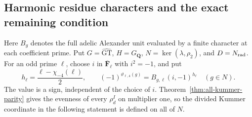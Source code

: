 \subsection{Harmonic residue characters and the exact remaining condition}

Here \(B_g\) denotes the full adelic Alexander unit evaluated by a
finite character at each coefficient prime. Put \(G=\widehat{\mathrm{GT}}\),
\(H=G_{\mathbf Q}\), \(N=\ker(\lambda,\rho_2)\), and
\(D=N_{\rm rad}\). For an odd prime \(\ell\), choose \(i\) in
\(\overline{\mathbf F}_\ell\) with \(i^2=-1\), and put
\[
 h_\ell=\frac{\ell-\chi_{-4}(\ell)}2,\qquad
 (-1)^{\vartheta_{\ell,4}(g)}
       =B_{g,\ell}(i,-1)^{h_\ell}\quad(g\in N).
\]
The value is a sign, independent of the choice of \(i\).
Theorem~\ref{thm:all-kummer-parity} gives the evenness of every
\(\rho_d^I\) on multiplier one, so the divided Kummer coordinate
in the following statement is defined on all of \(N\).

